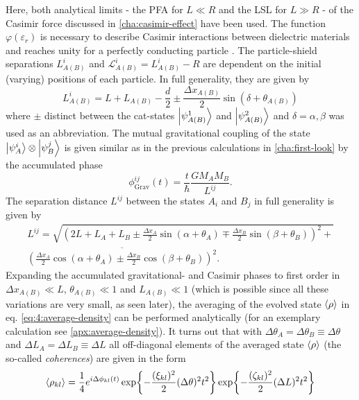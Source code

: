 Here, both analytical limits - the PFA for $L \ll R$ and the LSL for $L \gg R$ - of the Casimir force discussed in \cref{cha:casimir-effect} have been used.
The function $\varphi(\varepsilon_r)$ is necessary to describe Casimir interactions between dielectric materials and reaches unity for a perfectly conducting particle \cite{Lifshitz_1956}.
The particle-shield separations $L^i_{A(B)}$ and $\mathscr{L}^i_{A(B)} = L^i_{A(B)}-R$ are dependent on the initial (varying) positions of each particle.
In full generality, they are given by
\begin{equation}\label{eq:4:L-casimir}
  L^i_{A(B)} = L + L_{A(B)} - \frac{d}{2} \pm \frac{\Delta x_{A(B)}}{2} \sin(\delta + \theta_{A(B)})
\end{equation}
where $\pm$ distinct between the cat-states $\ket{\psi^1_{A(B)}}$ and $\ket{\psi^2_{A(B)}}$ and $\delta = \alpha, \beta$ was used as an abbreviation.
The mutual gravitational coupling of the state $\ket{\psi^i_A}\otimes\ket{\psi^j_B}$ is given similar as in the previous calculations in \cref{cha:first-look} by the accumulated phase
\begin{equation}
  \phi^{ij}_\mathrm{Grav}(t) = \frac{t}{\hbar} \frac{G M_A M_B}{L^{ij}} .
\end{equation}
The separation distance $L^{ij}$ between the states $A_i$ and $B_j$ in full generality is given by
\begin{multline}\label{eq:4:L-gravity}
  L^{ij} = \sqrt{\left(2L + L_A + L_B \pm \frac{\Delta x_A}{2}\sin(\alpha + \theta_A) \mp \frac{\Delta x_B}{2}\sin(\beta + \theta_B)\right)^2 +} \\ \overline{\left(\frac{\Delta x_A}{2}\cos(\alpha + \theta_A) \pm \frac{\Delta x_B}{2}\cos(\beta + \theta_B)\right)^2} .
\end{multline}
Expanding the accumulated gravitational- and Casimir phases to first order in $\Delta x_{A(B)} \ll L$, $\theta_{A(B)} \ll 1$ and $L_{A(B)} \ll 1$ (which is possible since all these variations are very small, as seen later), the averaging of the evolved state $\left\langle\rho\right\rangle$ in eq. \eqref{eq:4:average-density} can be performed analytically (for an exemplary calculation see \cref{apx:average-density}).
It turns out that with $\Delta \theta_A = \Delta \theta_B \equiv \Delta\theta$ and $\Delta L_A = \Delta L_B \equiv \Delta L$ all off-diagonal elements of the averaged state $\left\langle\rho\right\rangle$ (the so-called \emph{coherences}) are given in the form
\begin{equation}\label{eq:4:average-density-element}
  \left\langle\rho_{kl}\right\rangle = \frac{1}{4} e^{i \Delta \phi_{kl}(t)} \exp{-\frac{(\xi_{kl})^2}{2} (\Delta\theta)^2 t^2} \exp{-\frac{(\zeta_{kl})^2}{2} (\Delta L)^2 t^2}
\end{equation}
